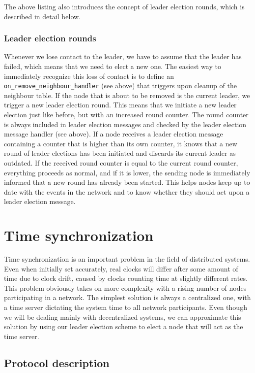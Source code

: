\documentclass[11pt,
  a4paper,
  ngerman,
  BCOR=7mm
]{scrartcl}
\begin{document}
The above listing also introduces the concept of leader election rounds,
which is described in detail below.

\subsubsection*{Leader election rounds}
\label{ssub:leader_election_rounds}
Whenever we lose contact to the leader, we have to assume that the
leader has failed, which means that we need to elect a new one. The
easiest way to immediately recognize this loss of contact is to define
an \lstinline!on_remove_neighbour_handler! (see above) that triggers
upon cleanup of the neighbour table. If the node that is about to be
removed is the current leader, we trigger a new leader election round.
This means that we initiate a new leader election just like before, but
with an increased round counter. The round counter is always included in
leader election messages and checked by the leader election message
handler (see above). If a node receives a leader election message
containing a counter that is higher than its own counter, it knows that
a new round of leader elections has been initiated and discards its
current leader as outdated. If the received round counter is equal to
the current round counter, everything proceeds as normal, and if it is
lower, the sending node is immediately informed that a new round has
already been started. This helps nodes keep up to date with the events
in the network and to know whether they should act upon a leader
election message.

\section*{Time synchronization}
\label{sec:Time synchronization}
Time synchronization is an important problem in the field of distributed
systems. Even when initially set accurately, real clocks will differ
after some amount of time due to clock drift, caused by clocks counting
time at slightly different rates. This problem obviously takes on more
complexity with a rising number of nodes participating in a network. The
simplest solution is always a centralized one, with a time server
dictating the system time to all network participants. Even though we
will be dealing mainly with decentralized systems, we can approximate
this solution by using our leader election scheme to elect a node that
will act as the time server.

\subsection*{Protocol description}
\label{sub:protocol_time_synch}
\end{document}
